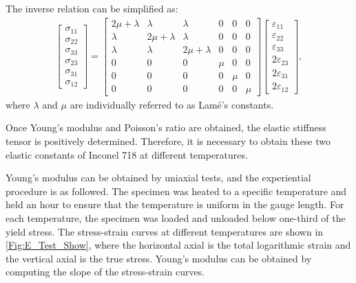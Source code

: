The inverse relation can be simplified as:
\begin{eqnarray}
   \begin{bmatrix}\sigma_{11} \\ \sigma_{22} \\ \sigma_{33} \\ \sigma_{23} \\ \sigma_{31} \\ \sigma_{12} \end{bmatrix}
   =
   \begin{bmatrix} 2\mu+\lambda & \lambda & \lambda & 0 & 0 & 0 \\
                   \lambda & 2\mu+\lambda & \lambda & 0 & 0 & 0 \\
                   \lambda & \lambda & 2\mu+\lambda & 0 & 0 & 0 \\
                   0 & 0 & 0 & \mu & 0 & 0 \\
                   0 & 0 & 0 & 0 & \mu & 0 \\
                   0 & 0 & 0 & 0 & 0 & \mu \end{bmatrix}
    \begin{bmatrix}\varepsilon_{11} \\ \varepsilon_{22} \\ \varepsilon_{33} \\ 2\varepsilon_{23} \\ 2\varepsilon_{31} \\ 2\varepsilon_{12} \end{bmatrix},
\end{eqnarray}
where $\lambda$ and $\mu$ are individually referred to as Lam\'{e}'s constants.

Once Young's modulus and Poisson's ratio are obtained, the elastic stiffness tensor is positively determined.
Therefore, it is necessary to obtain these two elastic constants of Inconel 718 at different temperatures.

Young's modulus can be obtained by uniaxial tests, and the experiential procedure is as followed.
The specimen was heated to a specific temperature and held an hour to ensure that the temperature is uniform in the gauge length.
For each temperature, the specimen was loaded and unloaded below one-third of the yield stress.
The stress-strain curves at different temperatures are shown in \ref{Fig:E_Test_Show}, where the horizontal axial is the total logarithmic strain and the vertical axial is the true stress.
Young's modulus can be obtained by computing the slope of the stress-strain curves.

